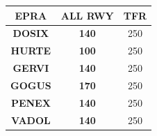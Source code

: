 \centering
{}
\begin{tabular}{|c|c|c|}
	\hline\rowcolor{white}
	\cellcolor{vred}\color{white}\textbf{EPRA} & \textbf{ALL RWY} & \textbf{TFR} \\\hline
	\textbf{DOSIX}                             & \textbf{140}     & 250          \\\hline
	\textbf{HURTE}                             & \textbf{100}     & 250          \\\hline
	\textbf{GERVI}                             & \textbf{140}     & 250          \\\hline
	\textbf{GOGUS}                             & \textbf{170}     & 250          \\\hline
	\textbf{PENEX}                             & \textbf{140}     & 250          \\\hline
	\textbf{VADOL}                             & \textbf{140}     & 250          \\\hline
\end{tabular}
